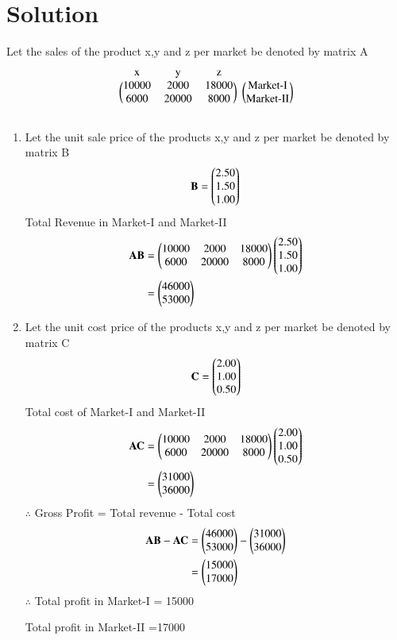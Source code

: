 \documentclass[journal,12pt,twocolumn]{IEEEtran}
\begin{document}
\section{Solution}
Let the sales of the product x,y and z per market be denoted by  matrix A
\begin{align}
\begin{blockarray}{cccc}
\text{x} & \text{y} & \text{z} \\
\begin{block}{(ccc)(c)}
10000 & 2000 & 18000 & \text{Market-I}\\
6000 & 20000 & 8000 & \text{Market-II} \\
\end{block}
\end{blockarray}
\end{align}
\begin {enumerate}
\item
Let the unit sale price of the products x,y and z per market be denoted by matrix B
\begin{align}
\mathbf{B}=\begin{pmatrix}2.50\\1.50\\1.00\end{pmatrix}
\end{align}
Total Revenue in Market-I and Market-II
\begin{align}
\mathbf{A}\mathbf{B}&=\begin{pmatrix}10000&2000&18000\\6000&20000&8000\end{pmatrix}\begin{pmatrix}2.50\\1.50\\1.00\end{pmatrix}\\
&=\begin{pmatrix}46000\\53000\end{pmatrix}
\end{align}
\item
Let the unit cost price of the products x,y and z per market be denoted by matrix C
\begin{align}
\mathbf{C}=\begin{pmatrix}2.00\\1.00\\0.50\end{pmatrix}
\end{align}
Total cost of Market-I and Market-II
\begin{align}
\mathbf{A}\mathbf{C}&=\begin{pmatrix}10000&2000&18000\\6000&20000&8000\end{pmatrix}\begin{pmatrix}2.00\\1.00\\0.50\end{pmatrix}\\
&=\begin{pmatrix}31000\\36000\end{pmatrix}
\end{align}
$\therefore$ Gross Profit = Total revenue - Total cost
\begin{align}
\mathbf{A}\mathbf{B}-\mathbf{A}\mathbf{C}&=\begin{pmatrix}46000\\53000\end{pmatrix} - \begin{pmatrix}31000\\36000\end{pmatrix}  \\
&=\begin{pmatrix}15000\\17000\end{pmatrix}
\end{align}
$\therefore$ Total profit in Market-I = 15000

Total profit in Market-II =17000
\end{enumerate}
\end{document}
